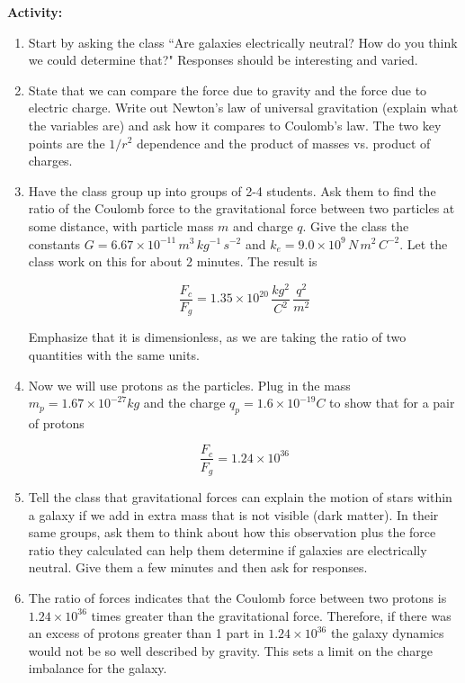 \documentclass{article}
\begin{document}
\textbf{Activity:}
\begin{enumerate}
\item Start by asking the class ``Are galaxies electrically neutral? How do you think we could determine that?" Responses should be interesting and varied.

\item State that we can compare the force due to gravity and the force due to electric charge. Write out Newton's law of universal gravitation (explain what the variables are) and ask how it compares to Coulomb's law. The two key points are the $1/r^2$ dependence and the product of masses vs. product of charges.

\item Have the class group up into groups of 2-4 students. Ask them to find the ratio of the Coulomb force to the gravitational force between two particles at some distance, with particle mass $m$ and charge $q$. Give the class the constants $G = 6.67 \times 10^{-11} \, m^3 \, kg^{-1} \, s^{-2}$ and $k_e = 9.0 \times 10^9 \, N \, m^2 \, C^{-2}$. Let the class work on this for about 2 minutes. The result is

\begin{equation}
	\frac{F_c}{F_g} = 1.35 \times 10^{20} \, \frac{kg^2}{C^2} \, \frac{q^2}{m^2}
\end{equation}

Emphasize that it is dimensionless, as we are taking the ratio of two quantities with the same units.

\item Now we will use protons as the particles. Plug in the mass $m_p = 1.67 \times 10^{-27} kg$ and the charge $q_p = 1.6 \times 10^{-19} C$ to show that for a pair of protons

\begin{equation}
	\frac{F_c}{F_g} = 1.24 \times 10^{36}
\end{equation}

\item Tell the class that gravitational forces can explain the motion of stars within a galaxy if we add in extra mass that is not visible (dark matter). In their same groups, ask them to think about how this observation plus the force ratio they calculated can help them determine if galaxies are electrically neutral. Give them a few minutes and then ask for responses.

\item The ratio of forces indicates that the Coulomb force between two protons is $1.24 \times 10^{36}$ times greater than the gravitational force. Therefore, if there was an excess of protons greater than 1 part in $1.24 \times 10^{36}$ the galaxy dynamics would not be so well described by gravity. This sets a limit on the charge imbalance for the galaxy. 


\end{enumerate}
\end{document}
